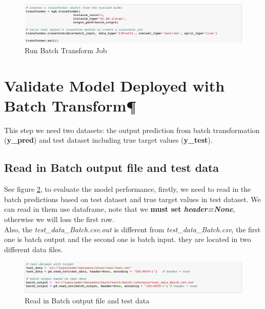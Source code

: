\documentclass[12pt]{article}
\begin{document}
\begin{figure}[H]
\centering
\begin{minipage}{1\textwidth}
  \centering
  \includegraphics[width=1\linewidth]{batch_transform_job.png}
   \caption{Run Batch Transform Job}
   \label{fig:batch_transform_job}
\end{minipage}%
\end{figure}
\noindent



\newpage
\section{Validate Model Deployed with Batch Transform¶}
This step we need two datasets: the output prediction from batch transformation (\textbf{y\_pred}) and test dataset including true target values (\textbf{y\_test}).

\subsection{Read in Batch output file and test data}
See figure \ref{fig:read_in_testData}, to evaluate the model performance, firstly, we need to read in the batch predictions based on test dataset and true target values in test dataset. We can read in them use dataframe, note that we \textbf{must set \textit{header=None}}, otherwise we will loss the first row. 
\\
\noindent
Also, the \textit{test\_data\_Batch.csv.out} is different from \textit{test\_data\_Batch.csv}, the first one is batch output and the second one is batch input. they are located in two different data files.

\begin{figure}[H]
\centering
\begin{minipage}{1\textwidth}
  \centering
  \includegraphics[width=1\linewidth]{read_in_testData.png}
   \caption{Read in Batch output file and test data}
   \label{fig:read_in_testData}
\end{minipage}%
\end{figure}
\noindent
\end{document}
